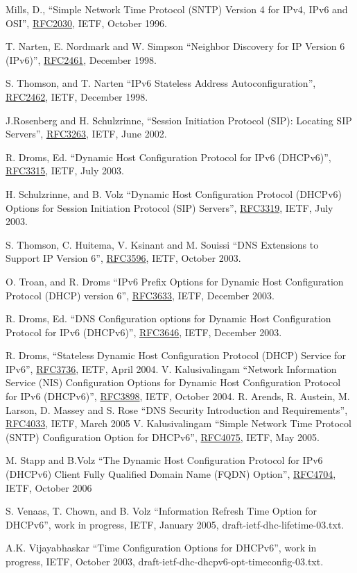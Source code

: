 \newpage

\newcommand{\rfc}[1]{\href{http://tools.ietf.org/html/rfc#1}{RFC#1}}
\begin{thebibliography}{1}

 Mills, D., ``Simple Network Time Protocol (SNTP) Version 4 for
        IPv4, IPv6 and OSI'', \rfc{2030}, IETF, October 1996.

 T. Narten, E. Nordmark and W. Simpson ``Neighbor
	Discovery for IP Version 6 (IPv6)'', \rfc{2461}, December 1998.

 S. Thomson, and T. Narten ``IPv6 Stateless Address
  Autoconfiguration'', \rfc{2462}, IETF, December 1998.

 J.Rosenberg and H. Schulzrinne, ``Session Initiation Protocol
       (SIP): Locating SIP Servers'', \rfc{3263}, IETF, June 2002.

 R. Droms, Ed. ``Dynamic Host Configuration Protocol
  for IPv6 (DHCPv6)'', \rfc{3315}, IETF, July 2003.

 H. Schulzrinne, and B. Volz ``Dynamic Host
  Configuration Protocol (DHCPv6) Options for Session Initiation
  Protocol (SIP) Servers'', \rfc{3319}, IETF, July 2003.

 S. Thomson, C. Huitema, V. Ksinant and M. Souissi
  ``DNS Extensions to Support IP Version 6'', \rfc{3596}, IETF, October
  2003.

 O. Troan, and R. Droms ``IPv6 Prefix Options for
  Dynamic Host Configuration Protocol (DHCP) version 6'', \rfc{3633},
  IETF, December 2003.

 R. Droms, Ed. ``DNS Configuration options for
  Dynamic Host Configuration Protocol for IPv6 (DHCPv6)'', \rfc{3646},
  IETF, December 2003.

 R. Droms, ``Stateless Dynamic Host Configuration
  Protocol (DHCP) Service for IPv6'', \rfc{3736}, IETF, April 2004.
 V. Kalusivalingam ``Network Information Service
  (NIS) Configuration Options for Dynamic Host Configuration Protocol
  for IPv6 (DHCPv6)'', \rfc{3898}, IETF, October 2004.
 R. Arends,  R. Austein, M. Larson, D. Massey and S. Rose
  ``DNS Security Introduction and Requirements'',
  \rfc{4033}, IETF, March 2005
 V. Kalusivalingam ``Simple Network Time Protocol
	(SNTP) Configuration Option for DHCPv6'', \rfc{4075}, IETF, May 2005.

 M. Stapp and  B.Volz ``The Dynamic Host
Configuration Protocol for IPv6 (DHCPv6) Client Fully Qualified Domain
Name (FQDN) Option'', \rfc{4704}, IETF, October 2006

 S. Venaas, T. Chown, and B. Volz
 ``Information Refresh Time Option for DHCPv6'', work in progress,
 IETF, January 2005, draft-ietf-dhc-lifetime-03.txt.

 A.K. Vijayabhaskar ``Time Configuration Options
	for DHCPv6'', work in progress, IETF, October 2003,
	draft-ietf-dhc-dhcpv6-opt-timeconfig-03.txt.

\end{thebibliography}
